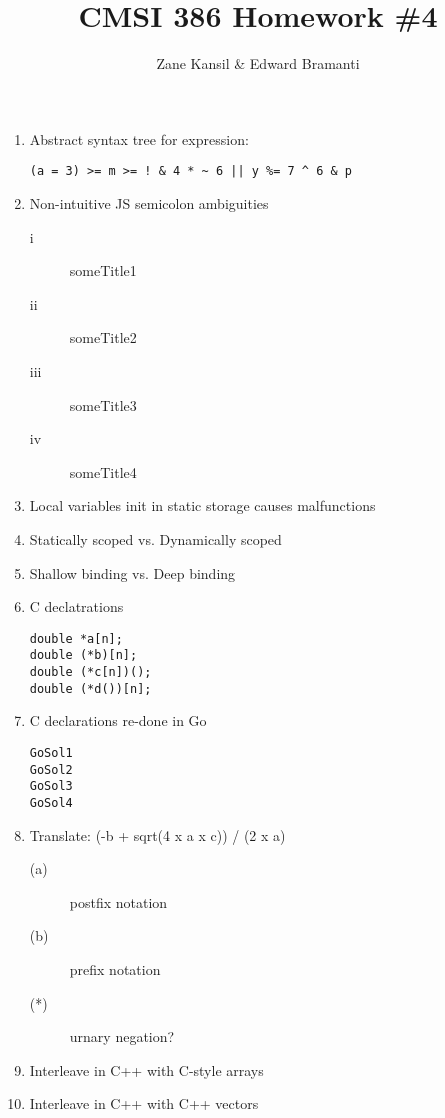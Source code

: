 \documentclass{article}
\title{CMSI 386 Homework \#4}
\author{Zane Kansil \& Edward Bramanti}
\begin{document}
\maketitle
\begin{enumerate}
\item Abstract syntax tree for expression:
\begin{verbatim}
(a = 3) >= m >= ! & 4 * ~ 6 || y %= 7 ^ 6 & p
\end{verbatim}
\item Non-intuitive JS semicolon ambiguities
\begin{description}
  \item[i] someTitle1
  \item[ii] someTitle2
  \item[iii] someTitle3
  \item[iv] someTitle4
\end{description}
\item Local variables init in static storage causes malfunctions
\item Statically scoped vs. Dynamically scoped
\item Shallow binding vs. Deep binding
\item C declatrations
\begin{verbatim}
double *a[n];
double (*b)[n];
double (*c[n])();
double (*d())[n];
\end{verbatim}
\item C declarations re-done in Go
\begin{verbatim}
GoSol1
GoSol2
GoSol3
GoSol4
\end{verbatim}
\item Translate: (-b + sqrt(4 x a x c)) / (2 x a)
\begin{description}
  \item[(a)] postfix notation
  \item[(b)] prefix notation
  \item[(*)] urnary negation?
\end{description}
\item Interleave in C++ with C-style arrays
\item Interleave in C++ with C++ vectors
\end{enumerate}
\end{document}
